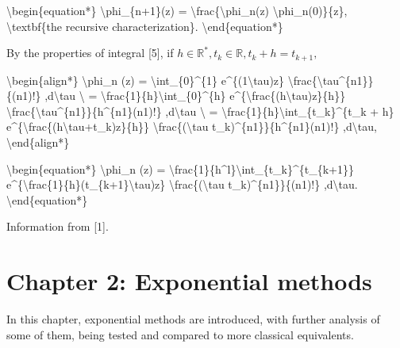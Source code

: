 \documentclass[letterpaper,10pt,english]{jupyterBook}
\begin{document}
\sphinxAtStartPar
\textbackslash{}begin\{equation*\}
\textbackslash{}phi\_\{n+1\}(z) = \textbackslash{}frac\{\textbackslash{}phi\_n(z) \sphinxhyphen{} \textbackslash{}phi\_n(0)\}\{z\}, \textbackslash{}textbf\{the recursive characterization\}.
\textbackslash{}end\{equation*\}

\sphinxAtStartPar
By the properties of integral {[}5{]}, if \(h \in \mathbb{R}^*, t_k \in \mathbb{R}, t_k+h = t_{k+1},\)

\sphinxAtStartPar
\textbackslash{}begin\{align*\}
\textbackslash{}phi\_n (z) = \textbackslash{}int\_\{0\}\textasciicircum{}\{1\} e\textasciicircum{}\{(1\sphinxhyphen{}\textbackslash{}tau)z\} \textbackslash{}frac\{\textbackslash{}tau\textasciicircum{}\{n\sphinxhyphen{}1\}\}\{(n\sphinxhyphen{}1)!\} ,d\textbackslash{}tau \textbackslash{}
= \textbackslash{}frac\{1\}\{h\}\textbackslash{}int\_\{0\}\textasciicircum{}\{h\} e\textasciicircum{}\{\textbackslash{}frac\{(h\sphinxhyphen{}\textbackslash{}tau)z\}\{h\}\} \textbackslash{}frac\{\textbackslash{}tau\textasciicircum{}\{n\sphinxhyphen{}1\}\}\{h\textasciicircum{}\{n\sphinxhyphen{}1\}(n\sphinxhyphen{}1)!\} ,d\textbackslash{}tau \textbackslash{}
= \textbackslash{}frac\{1\}\{h\}\textbackslash{}int\_\{t\_k\}\textasciicircum{}\{t\_k + h\} e\textasciicircum{}\{\textbackslash{}frac\{(h\sphinxhyphen{}\textbackslash{}tau+t\_k)z\}\{h\}\} \textbackslash{}frac\{(\textbackslash{}tau \sphinxhyphen{} t\_k)\textasciicircum{}\{n\sphinxhyphen{}1\}\}\{h\textasciicircum{}\{n\sphinxhyphen{}1\}(n\sphinxhyphen{}1)!\} ,d\textbackslash{}tau,
\textbackslash{}end\{align*\}

\sphinxAtStartPar
\textbackslash{}begin\{equation*\}
\textbackslash{}phi\_n (z) = \textbackslash{}frac\{1\}\{h\textasciicircum{}l\}\textbackslash{}int\_\{t\_k\}\textasciicircum{}\{t\_\{k+1\}\} e\textasciicircum{}\{\textbackslash{}frac\{1\}\{h\}(t\_\{k+1\}\sphinxhyphen{}\textbackslash{}tau)z\} \textbackslash{}frac\{(\textbackslash{}tau \sphinxhyphen{} t\_k)\textasciicircum{}\{n\sphinxhyphen{}1\}\}\{(n\sphinxhyphen{}1)!\} ,d\textbackslash{}tau.
\textbackslash{}end\{equation*\}

\sphinxAtStartPar
Information from {[}1{]}.

\sphinxstepscope


\section{Chapter 2: Exponential methods}
\label{\detokenize{cap4:chapter-2-exponential-methods}}\label{\detokenize{cap4::doc}}
\sphinxAtStartPar
In this chapter, exponential methods are introduced, with further analysis of some of them, being tested and compared to more classical equivalents.
\end{document}
